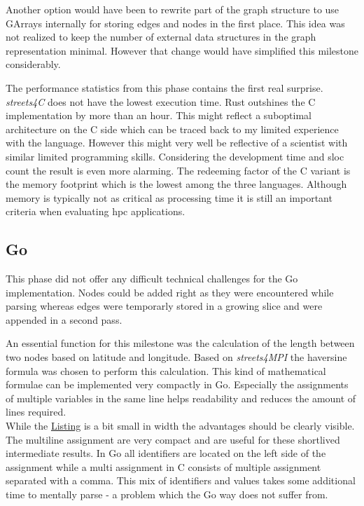 Another option would have been to rewrite part of the graph structure to use GArrays internally for storing edges and nodes in the first place. This idea was not realized to keep the number of external data structures in the graph representation minimal. However that change would have simplified this milestone considerably.

The performance statistics from this phase contains the first real surprise. \textit{streets4C} does not have the lowest execution time. Rust outshines the C implementation by more than an hour. This might reflect a suboptimal architecture on the C side which can be traced back to my limited experience with the language. However this might very well be reflective of a scientist with similar limited programming skills. Considering the development time and \gls{sloc} count the result is even more alarming. The redeeming factor of the C variant is the memory footprint which is the lowest among the three languages. Although memory is typically not as critical as processing time it is still an important criteria when evaluating \gls{hpc} applications.

\subsection{Go}
\label{subsec:Implementation::SequentialBenchmark::Go}

This phase did not offer any difficult technical challenges for the Go implementation. Nodes could be added right as they were encountered while parsing whereas edges were temporarly stored in a growing slice and were appended in a second pass.

An essential function for this milestone was the calculation of the length between two nodes based on latitude and longitude. Based on \textit{streets4MPI} the haversine formula was chosen to perform this calculation. This kind of mathematical formulae can be implemented very compactly in Go. Especially the assignments of multiple variables in the same line helps readability and reduces the amount of lines required.
\\


While the \hyperref[lst:haversine.go]{Listing} is a bit small in width the advantages should be clearly visible. The multiline assignment are very compact and are useful for these shortlived intermediate results. In Go all identifiers are located on the left side of the assignment while a multi assignment in C consists of multiple assignment separated with a comma. This mix of identifiers and values takes some additional time to mentally parse - a problem which the Go way does not suffer from.


